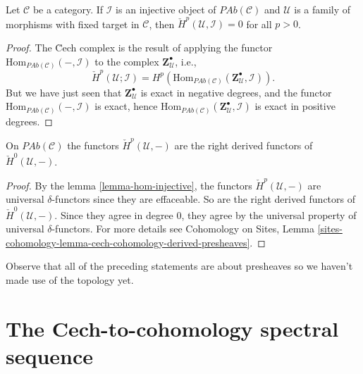 \begin{lemma}
\label{lemma-hom-injective}
Let $\mathcal{C}$ be a category. If $\mathcal{I}$ is an injective object of
$\textit{PAb}(\mathcal{C})$ and $\mathcal{U}$ is a family of morphisms with
fixed target in $\mathcal{C}$, then $\check H^p(\mathcal{U}, \mathcal{I}) = 0$
for all $p>0$.
\end{lemma}

\begin{proof}
The \u Cech complex is the result of applying the functor
$\text{Hom}_{\textit{PAb}(\mathcal{C})}(-, \mathcal{I}) $ to the complex $
\mathbf{Z}^\bullet_\mathcal{U} $, i.e.,
$$
\check H^p(\mathcal{U} ; \mathcal{I}) = H^p
(\text{Hom}_{\textit{PAb}(\mathcal{C})} (\mathbf{Z}^\bullet_\mathcal{U},
\mathcal{I})).
$$
But we have just seen that $\mathbf{Z}^\bullet_\mathcal{U}$ is exact in
negative degrees, and the functor $\text{Hom}_{\textit{PAb}(\mathcal{C})}(-,
\mathcal{I})$ is exact, hence $\text{Hom}_{\textit{PAb}(\mathcal{C})}
(\mathbf{Z}^\bullet_\mathcal{U}, \mathcal{I})$ is exact in positive degrees.
\end{proof}

\begin{theorem}
\label{theorem-cech-derived}
On $\textit{PAb}(\mathcal{C})$ the functors $\check{H}^p(\mathcal{U}, -)$ are
the right derived functors of $\check{H}^0(\mathcal{U}, -)$.
\end{theorem}

\begin{proof}
By the lemma \ref{lemma-hom-injective}, the functors $\check
H^p(\mathcal{U}, -)$ are universal $\delta$-functors since they are effaceable.
So are the right derived functors of $\check H^0(\mathcal{U}, -)$. Since they
agree in degree $0$, they agree by the universal property of universal
$\delta$-functors. For more details see
Cohomology on Sites,
Lemma \ref{sites-cohomology-lemma-cech-cohomology-derived-presheaves}. 
\end{proof}

\begin{remark}
\label{remark-presheaves-no-topology}
Observe that all of the preceding statements are about presheaves so we haven't
made use of the topology yet.
\end{remark}




\section{The Cech-to-cohomology spectral sequence}
\label{section-cech-ss}

